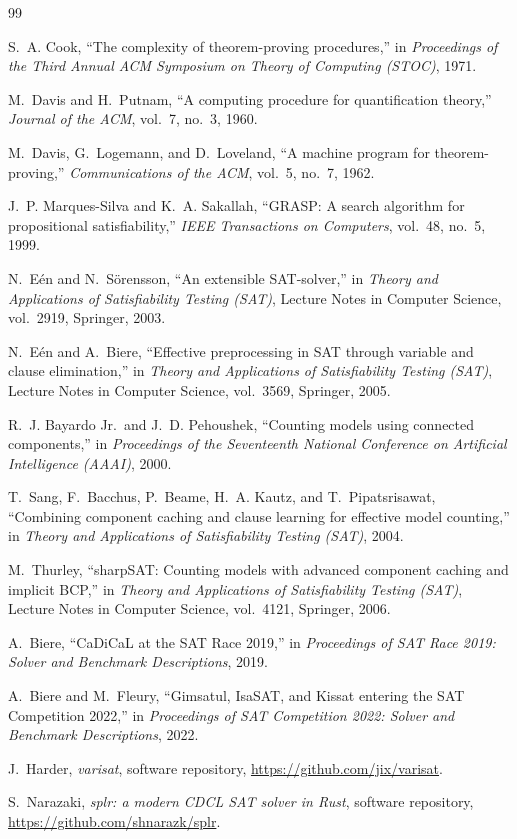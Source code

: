 \documentclass[conference]{IEEEtran}
\begin{document}
\begin{thebibliography}{99}

S.~A. Cook, ``The complexity of theorem-proving procedures,'' in \emph{Proceedings of the Third
Annual ACM Symposium on Theory of Computing (STOC)}, 1971.

M.~Davis and H.~Putnam, ``A computing procedure for quantification theory,'' \emph{Journal of the
ACM}, vol.~7, no.~3, 1960.

M.~Davis, G.~Logemann, and D.~Loveland, ``A machine program for theorem-proving,''
\emph{Communications of the ACM}, vol.~5, no.~7, 1962.

J.~P. Marques-Silva and K.~A. Sakallah, ``GRASP: A search algorithm for propositional
satisfiability,'' \emph{IEEE Transactions on Computers}, vol.~48, no.~5, 1999.

N.~E{\'e}n and N.~S{\"o}rensson, ``An extensible SAT-solver,'' in \emph{Theory and Applications
of Satisfiability Testing (SAT)}, Lecture Notes in Computer Science, vol.~2919, Springer, 2003.

N.~E{\'e}n and A.~Biere, ``Effective preprocessing in SAT through variable and clause
elimination,'' in \emph{Theory and Applications of Satisfiability Testing (SAT)}, Lecture Notes in
Computer Science, vol.~3569, Springer, 2005.

R.~J. Bayardo Jr.\ and J.~D. Pehoushek, ``Counting models using connected components,'' in
\emph{Proceedings of the Seventeenth National Conference on Artificial Intelligence (AAAI)}, 2000.

T.~Sang, F.~Bacchus, P.~Beame, H.~A. Kautz, and T.~Pipatsrisawat, ``Combining component caching
and clause learning for effective model counting,'' in \emph{Theory and Applications of
Satisfiability Testing (SAT)}, 2004.

M.~Thurley, ``sharpSAT: Counting models with advanced component caching and implicit BCP,'' in
\emph{Theory and Applications of Satisfiability Testing (SAT)}, Lecture Notes in Computer Science,
vol.~4121, Springer, 2006.

A.~Biere, ``CaDiCaL at the SAT Race 2019,'' in \emph{Proceedings of SAT Race 2019: Solver and
Benchmark Descriptions}, 2019.

A.~Biere and M.~Fleury, ``Gimsatul, IsaSAT, and Kissat entering the SAT Competition 2022,'' in
\emph{Proceedings of SAT Competition 2022: Solver and Benchmark Descriptions}, 2022.

J.~Harder, \emph{varisat}, software repository, \url{https://github.com/jix/varisat}.

S.~Narazaki, \emph{splr: a modern CDCL SAT solver in Rust}, software repository,
\url{https://github.com/shnarazk/splr}.

\end{thebibliography}
\end{document}
